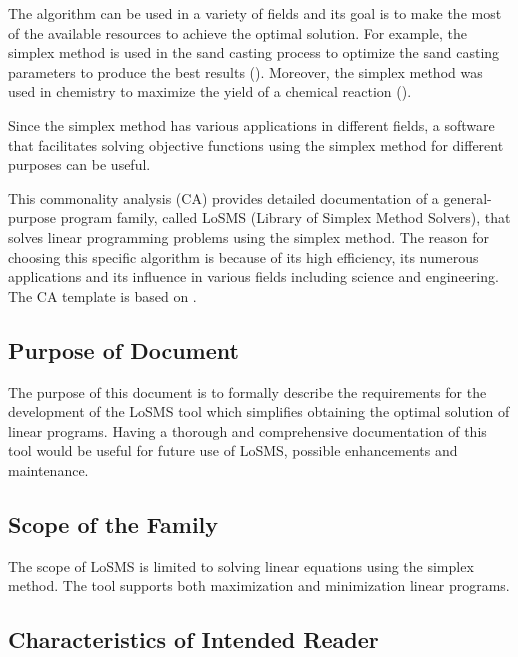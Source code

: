 \documentclass[12pt]{article}
\newcommand{\famname}{LoSMS} %
\begin{document}

The algorithm can be used in a variety of fields and its goal is to make the 
most of the available resources to achieve the optimal solution. For example, 
the simplex method is used in the sand casting process to optimize the sand 
casting parameters to produce the best results (\cite{sand-casting}). Moreover, 
the simplex method was used in chemistry to maximize the yield of a chemical 
reaction (\cite{chemistry}).

Since the simplex method has various applications in different fields, a 
software that facilitates solving objective functions using the simplex method 
for different purposes can be useful.

This commonality analysis (CA) provides detailed documentation of a 
general-purpose program family, called \famname{} (Library of Simplex Method 
Solvers), that solves linear programming problems using the simplex method. The 
reason for choosing this specific algorithm is because of its high efficiency, 
its numerous applications and its influence in various fields including science 
and engineering. The CA template is based on \citet{Smith2006}.

\subsection{Purpose of Document}

The purpose of this document is to formally describe the requirements for the 
development of the \famname{} tool which simplifies obtaining the optimal 
solution of linear programs. Having a thorough and comprehensive documentation 
of this tool would be useful for future use of \famname{}, possible 
enhancements and maintenance.

\subsection{Scope of the Family} 

The scope of \famname{} is limited to solving linear equations using the 
simplex method. The tool supports both maximization and minimization linear 
programs.

\subsection{Characteristics of Intended Reader} 
\end{document}
